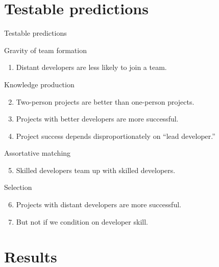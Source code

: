 \documentclass[
  ignorenonframetext,
  aspectratio=169,
]{beamer}
\providecommand{\tightlist}{%
  \setlength{\itemsep}{0pt}\setlength{\parskip}{0pt}}
\begin{document}
\section{Testable predictions}\label{testable-predictions}

\begin{frame}{Testable predictions}
\protect\hypertarget{testable-predictions-1}{}
\begin{block}{Gravity of team formation}
\protect\hypertarget{gravity-of-team-formation}{}
\begin{enumerate}
\tightlist
\item
  Distant developers are less likely to join a team.
\end{enumerate}
\end{block}

\begin{block}{Knowledge production}
\protect\hypertarget{knowledge-production}{}
\begin{enumerate}
\setcounter{enumi}{1}
\tightlist
\item
  Two-person projects are better than one-person projects.
\item
  Projects with better developers are more successful.
\item
  Project success depends disproportionately on ``lead developer.''
\end{enumerate}
\end{block}

\begin{block}{Assortative matching}
\protect\hypertarget{assortative-matching}{}
\begin{enumerate}
\setcounter{enumi}{4}
\tightlist
\item
  Skilled developers team up with skilled developers.
\end{enumerate}
\end{block}

\begin{block}{Selection}
\protect\hypertarget{selection-1}{}
\begin{enumerate}
\setcounter{enumi}{5}
\tightlist
\item
  Projects with distant developers are more successful.
\item
  But not if we condition on developer skill.
\end{enumerate}
\end{block}
\end{frame}

\section{Results}\label{results}
\end{document}
